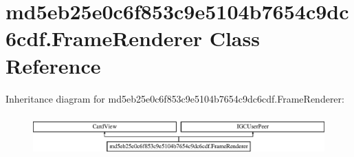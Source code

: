 \hypertarget{classmd5eb25e0c6f853c9e5104b7654c9dc6cdf_1_1FrameRenderer}{}\section{md5eb25e0c6f853c9e5104b7654c9dc6cdf.\+Frame\+Renderer Class Reference}
\label{classmd5eb25e0c6f853c9e5104b7654c9dc6cdf_1_1FrameRenderer}
Inheritance diagram for md5eb25e0c6f853c9e5104b7654c9dc6cdf.\+Frame\+Renderer\+:\begin{figure}[H]
\begin{center}
\leavevmode
\includegraphics[height=1.581921cm]{classmd5eb25e0c6f853c9e5104b7654c9dc6cdf_1_1FrameRenderer}
\end{center}
\end{figure}
